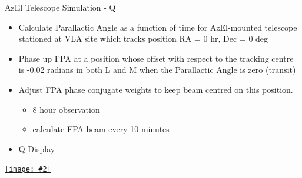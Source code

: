 \documentclass[pdf,azure,slideColor,colorBG]{prosper}
\newcommand{\moviewithpreview}[3]{%
    \pdfmark[{\texttt{[image: \#2]}}]{%
    pdfmark=/ANN,Subtype=/Movie,Movie=<< /F (#3) >>,%
    Activation=<< /ShowControls true /Mode /Repeat >>}}
\newcommand{\movie}[3]{%
    \pdfmark[{\hbox to #1 {\vbox to #2 { }}}]{%
    pdfmark=/ANN,Subtype=/Movie,Movie=<< /F (#3) /Poster true >>,%
    Activation=<< /ShowControls true /Mode /Repeat >>}}
\newcommand{\hrefWithPreview}[3]{%
  \href{#3}{\texttt{[image: \#2]}}
}
\begin{document}
\begin{slide} {AzEl Telescope Simulation - Q}
\begin{small}
\begin{itemize}
\item Calculate Parallactic Angle as a function of time for AzEl-mounted
telescope stationed at VLA site which tracks position RA = 0 hr, Dec = 0 deg
\item Phase up FPA at a position whose offset with respect to the
tracking centre is -0.02 radians in both L and M when the Parallactic Angle is zero (transit)
\item Adjust FPA phase conjugate weights to keep beam centred on this
position.
\begin{itemize}
\item 8 hour observation
\item calculate FPA beam every 10 minutes
\end{itemize}
\item Q Display
\end{itemize}
\end {small}
   \begin{center}
      \hrefWithPreview{3cm}{Q_azel_1.ps}{run:movies/Q_azel.gif}
   \end{center}
\end{slide}
\end{document}
